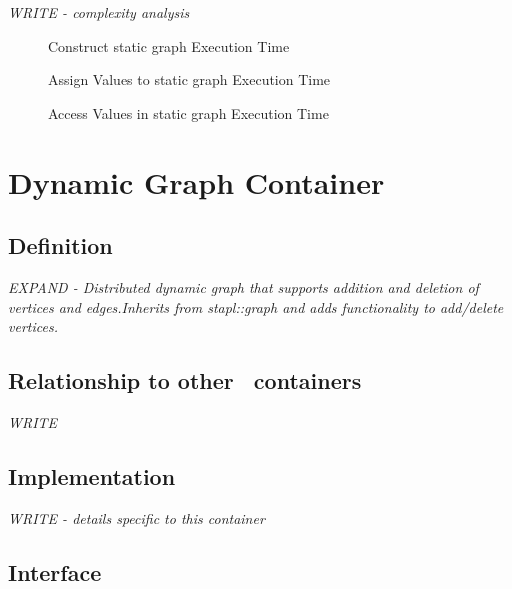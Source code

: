 \textit{WRITE - complexity analysis}

\begin{figure}[p]
\caption{Construct static graph Execution Time}
\label{fig:stgraf-cont-constr-exper}
\end{figure}

\begin{figure}[p]
\caption{Assign Values to static graph Execution Time}
\label{fig:stgraf-cont-assign-exper}
\end{figure}

\begin{figure}[p]
\caption{Access Values in static graph Execution Time}
\label{fig:stgraf-cont-access-exper}
\end{figure}



\section{Dynamic Graph Container} \label{sec-dygraf-cont}

\subsection{Definition}

\textit{EXPAND - Distributed dynamic graph that supports addition and deletion of vertices and edges.Inherits from stapl::graph and adds functionality to add/delete vertices.}

\subsection{Relationship to other \stapl\ containers}

\textit{WRITE}

\subsection{Implementation}

\textit{WRITE - details specific to this container}

\subsection{Interface} \label{sec-dygraf-cont-inter}

